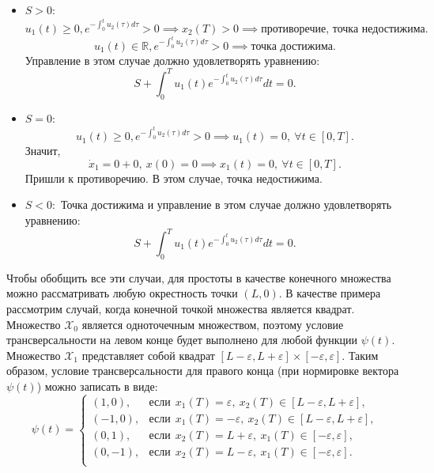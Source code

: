 \documentclass{article}
\begin{document}
\begin{itemize}
    \item [1.] $S > 0$:
    $$u_1(t) \geqslant 0, e^{-\int_0^t u_2(\tau) d\tau} > 0 \implies x_2(T) > 0 \implies \text{противоречие, точка недостижима.}$$
    $$u_1(t) \in \mathbb{R}, e^{-\int_0^t u_2(\tau) d\tau} > 0 \implies \text{точка достижима.} $$
    Управление в этом случае должно удовлетворять уравнению:
    $$S + \int_0^T u_1(t) e^{-\int_0^t u_2(\tau) d\tau} dt = 0.$$
    \item[2.] $S=0:$
    $$u_1(t) \geqslant 0, e^{-\int_0^t u_2(\tau) d\tau} > 0 \implies u_1(t) =  0, ~ \forall t\in[0, T].$$
    Значит, $$\dot{x}_1 = 0 + 0, ~x(0) = 0 \implies x_1(t) = 0, ~\forall t\in[0,T].$$
    Пришли к противоречию. В этом случае, точка недостижима.
    \item [3.] $S<0:$
    Точка достижима и управление в этом случае должно удовлетворять уравнению:
    $$S + \int_0^T u_1(t) e^{-\int_0^t u_2(\tau) d\tau} dt = 0.$$
\end{itemize}
Чтобы обобщить все эти случаи, для простоты в качестве конечного множества можно рассматривать любую окрестность точки $(L, 0)$. В качестве примера рассмотрим случай, когда конечной точкой множества является квадрат.\\
Множество $\mathcal{X}_0$ является одноточечным множеством, поэтому условие трансверсальности на левом конце будет выполнено для любой функции $\psi(t).$\\
Множество $\mathcal{X}_1$ представляет собой квадрат $[L-\varepsilon, L+\varepsilon]\times [-\varepsilon, \varepsilon].$ Таким образом, условие трансверсальности для правого конца (при нормировке вектора $\psi(t)$) можно записать в виде:
$$
\psi(t) = 
\begin{cases}
    (1, 0), &\text{если}  ~~x_1(T) = \varepsilon, ~x_2(T)\in[L-\varepsilon, L+\varepsilon
    ],\\
    (-1, 0), &\text{если}  ~~x_1(T) = -\varepsilon, ~x_2(T)\in[L-\varepsilon, L+\varepsilon
    ],\\
    (0, 1), &\text{если}  ~~x_2(T) = L + \varepsilon, ~x_1(T)\in[-\varepsilon, \varepsilon
    ],\\
    (0, -1), &\text{если}  ~~x_2(T) = L- \varepsilon, ~x_1(T)\in[-\varepsilon, \varepsilon
    ].\\
\end{cases}
$$
\end{document}

